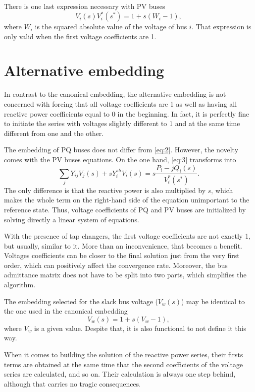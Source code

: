 \documentclass[journal]{IEEEtran}
\begin{document}
There is one last expression necessary with PV buses
\begin{equation}
  V_i(s)V^*_i(s^*)=1+s(W_i-1),\label{eq:6}
\end{equation}
where $W_i$ is the squared absolute value of the voltage of bus $i$. That expression is only valid when the first voltage coefficients are 1.


\section{Alternative embedding} \label{sec2}
In contrast to the canonical embedding, the alternative embedding is not concerned with forcing that all voltage coefficients are 1 as well as having all reactive power coefficients equal to 0 in the beginning. In fact, it is perfectly fine to initiate the series with voltages slightly different to 1 and at the same time different from one and the other. 

The embedding of PQ buses does not differ from \eqref{eq:2}. However, the novelty comes with the PV buses equations. On the one hand, \eqref{eq:3} transforms into
\begin{equation}
   \sum_{j} Y_{ij}V_j(s) + sY_i^{sh}V_i(s)=s\frac{P_i-jQ_i(s)}{V^*_i(s^*)}.
  \label{eq:7}
\end{equation}
The only difference is that the reactive power is also multiplied by $s$, which makes the whole term on the right-hand side of the equation unimportant to the reference state. Thus, voltage coefficients of PQ and PV buses are initialized by solving directly a linear system of equations.

With the presence of tap changers, the first voltage coefficients are not exactly 1, but usually, similar to it. More than an inconvenience, that becomes a benefit. Voltages coefficients can be closer to the final solution just from the very first order, which can positively affect the convergence rate. Moreover, the bus admittance matrix does not have to be split into two parts, which simplifies the algorithm.

The embedding selected for the slack bus voltage ($V_w(s)$) may be identical to the one used in the canonical embedding
\begin{equation}
  V_w(s)=1+s(V_w-1),
  \label{eq:8}
\end{equation}
where $V_w$ is a given value. Despite that, it is also functional to not define it this way.

When it comes to building the solution of the reactive power series, their firsts terms are obtained at the same time that the second coefficients of the voltage series are calculated, and so on. Their calculation is always one step behind, although that carries no tragic consequences. 
\end{document}
